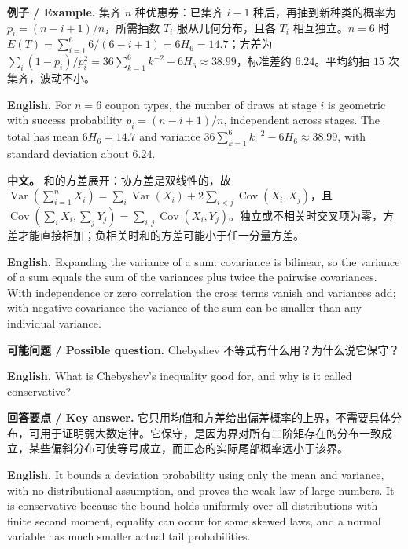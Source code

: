 \documentclass[UTF8,11pt,a4paper]{ctexart}
\newcommand{\EN}[1]{\par\noindent\textbf{English.} #1\par}
\newcommand{\EX}[2]{\par\noindent\textbf{例子 / Example.} #1\par\EN{#2}}
\newcommand{\ASK}[4]{\par\noindent\textbf{可能问题 / Possible question.} #1\par\EN{#2}\noindent\textbf{回答要点 / Key answer.} #3\par\EN{#4}\medskip}
\newcommand{\APS}[2]{\par\noindent\textbf{中文。} #1\par\noindent\textbf{English.} #2\par\smallskip}
\begin{document}
\EX{集齐 $n$ 种优惠券：已集齐 $i-1$ 种后，再抽到新种类的概率为 $p_i=(n-i+1)/n$，所需抽数 $T_i$ 服从几何分布，且各 $T_i$ 相互独立。$n=6$ 时 $E(T)=\sum_{i=1}^6 6/(6-i+1)=6H_6=14.7$；方差为 $\sum_i(1-p_i)/p_i^2=36\sum_{k=1}^6k^{-2}-6H_6\approx38.99$，标准差约 $6.24$。平均约抽 $15$ 次集齐，波动不小。}{For $n=6$ coupon types, the number of draws at stage $i$ is geometric with success probability $p_i=(n-i+1)/n$, independent across stages. The total has mean $6H_6=14.7$ and variance $36\sum_{k=1}^6k^{-2}-6H_6\approx38.99$, with standard deviation about $6.24$.}

\APS{和的方差展开：协方差是双线性的，故 $\operatorname{Var}(\sum_{i=1}^nX_i)=\sum_i\operatorname{Var}(X_i)+2\sum_{i<j}\operatorname{Cov}(X_i,X_j)$，且 $\operatorname{Cov}(\sum_iX_i,\sum_jY_j)=\sum_{i,j}\operatorname{Cov}(X_i,Y_j)$。独立或不相关时交叉项为零，方差才能直接相加；负相关时和的方差可能小于任一分量方差。}{Expanding the variance of a sum: covariance is bilinear, so the variance of a sum equals the sum of the variances plus twice the pairwise covariances. With independence or zero correlation the cross terms vanish and variances add; with negative covariance the variance of the sum can be smaller than any individual variance.}

\ASK{Chebyshev 不等式有什么用？为什么说它保守？}{What is Chebyshev's inequality good for, and why is it called conservative?}{它只用均值和方差给出偏差概率的上界，不需要具体分布，可用于证明弱大数定律。它保守，是因为界对所有二阶矩存在的分布一致成立，某些偏斜分布可使等号成立，而正态的实际尾部概率远小于该界。}{It bounds a deviation probability using only the mean and variance, with no distributional assumption, and proves the weak law of large numbers. It is conservative because the bound holds uniformly over all distributions with finite second moment, equality can occur for some skewed laws, and a normal variable has much smaller actual tail probabilities.}
\end{document}
